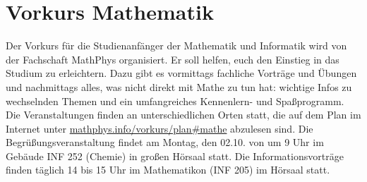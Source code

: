 \section{Vorkurs Mathematik}
\label{vkmathe}
Der Vorkurs für die Studienanfänger der Mathematik und Informatik wird von der Fachschaft MathPhys organisiert. Er soll helfen, euch den Einstieg in das Studium zu erleichtern. Dazu gibt es vormittags fachliche Vorträge und Übungen und nachmittags alles, was nicht direkt mit Mathe zu tun hat: wichtige Infos zu wechselnden Themen und ein umfangreiches Kennenlern- und Spaßprogramm. Die Veranstaltungen finden an unterschiedlichen Orten statt, die auf dem Plan im Internet unter \url{mathphys.info/vorkurs/plan\#mathe}  abzulesen sind. Die Begrüßungsveranstaltung findet am Montag, den 02.10. von um 9 Uhr im Gebäude \gls{INF} 252 (Chemie) in großen Hörsaal statt. Die Informationsvorträge finden täglich 14 bis 15 Uhr im Mathematikon (\gls{INF} 205) im Hörsaal statt.